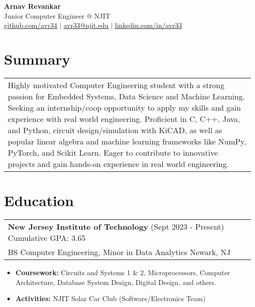 \documentclass{article}
\newcommand{\underlinedLink}[2]{
    {\underline{\large \href{#1}{#2}}}
}
\begin{document}
\begin{spacing}{1.4}
    \begin{center}
        {\bf\Huge Arnav Revankar} \\
        {\large Junior Computer Engineer @ NJIT} \\
        \underlinedLink{https://github.com/avr34}{github.com/avr34} $|$ \underlinedLink{mailto:avr33@njit.edu}{avr33@njit.edu} $|$ \underlinedLink{https://linkedin.com/in/avr33}{linkedin.com/in/avr33}
    \end{center}
\end{spacing}
\vspace{-9pt}

\section{Summary}
    \begin{center}
        \begin{tabular}{p{}}
            Highly motivated Computer Engineering student with a strong passion for Embedded Systems, Data Science and Machine Learning. Seeking an internship/coop opportunity to apply my skills and gain experience with real world engineering. Proficient in C, C++, Java, and Python, circuit design/simulation with KiCAD, as well as popular linear algebra and machine learning frameworks like NumPy, PyTorch, and Scikit Learn. Eager to contribute to innovative projects and gain hands-on experience in real world engineering. \\
        \end{tabular}
    \end{center}

\section{Education}
    \vspace{-5pt}\begin{center}
        \begin{tabular}{p{}}
            {\large \bf New Jersey Institute of Technology} (Sept 2023 - Present) \hfill Cumulative GPA: 3.65 \\
            BS Computer Engineering, Minor in Data Analytics \hfill Newark, NJ
        \end{tabular}
    \end{center}
    \vspace{-10pt}\begin{itemize}
        \item {\bf Coursework:} Circuits and Systems 1 \& 2, Microprocessors, Computer Architecture, Database System Design, Digital Design, and others.
        \item {\bf Activities:} NJIT Solar Car Club (Software/Electronics Team)
    \end{itemize}
\end{document}
